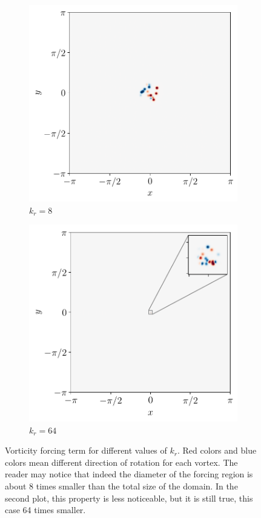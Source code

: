\documentclass[../main.tex]{subfiles}
\begin{document}
\begin{figure}[ht]
	\centering
	\begin{subfigure}{0.44\textwidth}
		\centering
		\includegraphics[width=\textwidth]{images/forcing32_8.pdf}
		\caption{$k_r = 8$}
	\end{subfigure}\hspace{0.04\textwidth}
	\begin{subfigure}{0.44\textwidth}
		\centering
		\includegraphics[width=\textwidth]{images/forcing32_64.pdf}
		\caption{$k_r = 64$}
	\end{subfigure}
	\caption{Vorticity forcing term for different values of $k_r$. Red colors and blue colors mean different direction of rotation for each vortex. The reader may notice that indeed the diameter of the forcing region is about 8 times smaller than the total size of the domain. In the second plot, this property is less noticeable, but it is still true, this case 64 times smaller.}\label{fig:forcing}
\end{figure}
\end{document}
